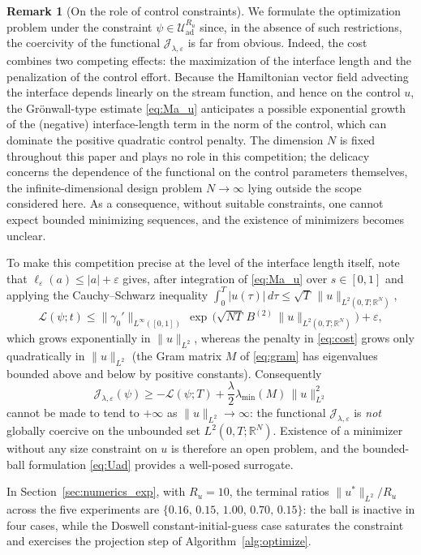 \documentclass[12pt, reqno]{amsart}
\theoremstyle{plain}
\theoremstyle{definition}
\newtheorem{remark}[thm]{Remark}
\numberwithin{equation}{section}
\numberwithin{figure}{section}
\numberwithin{algorithm}{section}
\begin{document}
\begin{remark}[On the role of control constraints]\label{rem:control_constraints}
We formulate the optimization problem under the constraint $\psi\in\mathcal U_{\mathrm{ad}}^{R_u}$ since, in the absence of such restrictions, the coercivity of the functional $\mathcal J_{\lambda,\varepsilon}$ is far from obvious. Indeed, the cost combines two competing effects: the maximization of the interface length and the penalization of the control effort. Because the Hamiltonian vector field advecting the interface depends linearly on the stream function, and hence on the control $u$, the Gr\"onwall-type estimate \eqref{eq:Ma_u} anticipates a possible exponential growth of the (negative) interface-length term in the norm of the control, which can dominate the positive quadratic control penalty. The dimension $N$ is fixed throughout this paper and plays no role in this competition; the delicacy concerns the dependence of the functional on the control parameters themselves, the infinite-dimensional design problem $N\to\infty$ lying outside the scope considered here. As a consequence, without suitable constraints, one cannot expect bounded minimizing sequences, and the existence of minimizers becomes unclear.

To make this competition precise at the level of the interface length itself, note that $\ell_\varepsilon(a)\le|a|+\varepsilon$ gives, after integration of \eqref{eq:Ma_u} over $s\in[0,1]$ and applying the Cauchy--Schwarz inequality $\int_0^T|u(\tau)|\,d\tau\le\sqrt T\,\|u\|_{L^2(0,T;\mathbb R^N)}$,
\begin{equation}\label{eq:length_u_bound}
\mathcal L(\psi;t)\le\|\gamma_0'\|_{L^\infty([0,1])}\,\exp\,\bigl(\sqrt{NT}\,B^{(2)}\,\|u\|_{L^2(0,T;\mathbb R^N)}\bigr)+\varepsilon,
\end{equation}
which grows exponentially in $\|u\|_{L^2}$, whereas the penalty in \eqref{eq:cost} grows only quadratically in $\|u\|_{L^2}$ (the Gram matrix $M$ of \eqref{eq:gram} has eigenvalues bounded above and below by positive constants). Consequently
\[
\mathcal J_{\lambda,\varepsilon}(\psi)\ge-\mathcal L(\psi;T)+\frac{\lambda}{2}\lambda_{\min}(M)\,\|u\|_{L^2}^2
\]
cannot be made to tend to $+\infty$ as $\|u\|_{L^2}\to\infty$: the functional $\mathcal J_{\lambda,\varepsilon}$ is \emph{not} globally coercive on the unbounded set $L^2(0,T;\mathbb R^N)$. Existence of a minimizer without any size constraint on $u$ is therefore an open problem, and the bounded-ball formulation \eqref{eq:Uad} provides a well-posed surrogate.

In Section~\ref{sec:numerics_exp}, with $R_u=10$, the terminal ratios $\|u^*\|_{L^2}/R_u$ across the five experiments are $\{0.16,\,0.15,\,1.00,\,0.70,\,0.15\}$: the ball is inactive in four cases, while the Doswell constant-initial-guess case saturates the constraint and exercises the projection step of Algorithm~\ref{alg:optimize}.
\end{remark}
\end{document}
